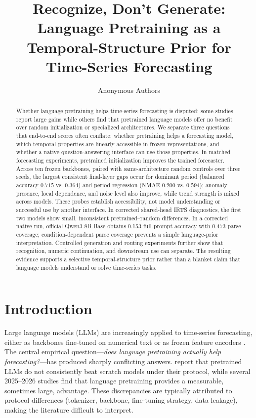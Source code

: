 \documentclass{article}
\title{Recognize, Don't Generate:\\ Language Pretraining as a Temporal-Structure
Prior for Time-Series Forecasting}
\author{Anonymous Authors}
\date{}
\begin{document}
\maketitle

\begin{abstract}
Whether language pretraining helps time-series forecasting is disputed: some
studies report large gains while others find that pretrained language models
offer no benefit over random initialization or specialized architectures.  We
separate three questions that end-to-end scores often conflate: whether
pretraining helps a forecasting model, which temporal properties are linearly
accessible in frozen representations, and whether a native question-answering
interface can use those properties.  In matched forecasting experiments,
pretrained initialization improves the trained forecaster.  Across ten frozen
backbones, paired with same-architecture random controls over three seeds, the
largest consistent final-layer gaps occur for dominant period (balanced
accuracy $0.715$ vs. $0.364$) and period regression (NMAE $0.200$ vs. $0.594$);
anomaly presence, local dependence, and noise level also improve, while trend
strength is mixed across models.  These probes establish accessibility, not
model understanding or successful use by another interface.  In corrected
shared-head IRTS diagnostics, the first two models show small, inconsistent
pretrained--random differences.  In a corrected native run, official
Qwen3-8B-Base obtains 0.153 full-prompt accuracy with 0.473 parse coverage;
condition-dependent parse coverage prevents a simple language-prior
interpretation.  Controlled generation and routing experiments further show
that recognition, numeric continuation, and downstream use can separate.
The resulting evidence supports a selective
temporal-structure prior rather than a blanket claim that language models
understand or solve time-series tasks.
\end{abstract}

\section{Introduction}\label{sec:intro}

Large language models (LLMs) are increasingly applied to time-series
forecasting, either as backbones fine-tuned on numerical text
\citep{gruver2023large,time-llm2023,qwen-time} or as frozen feature
encoders \citep{liu2024pre-training,rasul2024lag}.  The central empirical
question---\emph{does language pretraining actually help forecasting?}---has
produced sharply conflicting answers.  \citet{tan2024are} report that
pretrained LLMs do not consistently beat scratch models under their protocol,
while several 2025--2026 studies \citep{randominit2025,manifold2026} find that
language pretraining provides a measurable, sometimes large, advantage.  These
discrepancies are typically attributed to protocol differences (tokenizer,
backbone, fine-tuning strategy, data leakage), making the literature difficult
to interpret.
\end{document}
